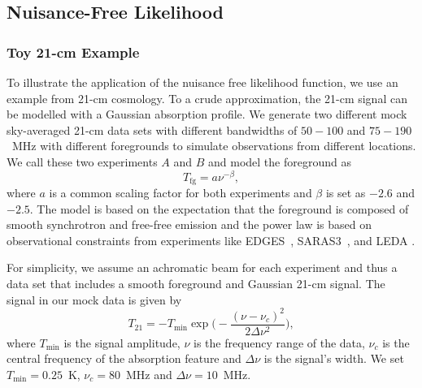 \subsection{Nuisance-Free Likelihood}
\label{sec:nuisance_free_likelihood_apps}

\subsubsection{Toy 21-cm Example}

To illustrate the application of the nuisance free likelihood function, we use an example from 21-cm cosmology.
To a crude approximation, the 21-cm signal can be modelled with a Gaussian absorption profile. %
We generate two different mock sky-averaged 21-cm data sets with different bandwidths of $50- 100$ and $75 - 190$~MHz with different foregrounds to simulate observations from different locations. We call these two experiments $A$ and $B$ and model the foreground as
\begin{equation}
    T_\mathrm{fg} = a \nu^{-\beta},
\end{equation}
where $a$ is a common scaling factor for both experiments and $\beta$ is set as $-2.6$ and $-2.5$. The model is based on the expectation that the foreground is composed of smooth synchrotron and free-free emission and the power law is based on observational constraints from experiments like EDGES~\citep{Mozdzen_EDGES_spectral_index_2017}, SARAS3~\citep{SARAS3}, and LEDA \citep{LEDA_spectral_Index_2021}.

For simplicity, we assume an achromatic beam for each experiment and thus a data set that includes a smooth foreground and Gaussian 21-cm signal. The signal in our mock data is given by
\begin{equation}
    T_{21} = - T_\mathrm{min} \exp\bigg(-\frac{(\nu - \nu_c)^2}{2\Delta \nu ^2}\bigg),
    \label{eq:gaussian_signal}
\end{equation}
where $T_\mathrm{min}$ is the signal amplitude, $\nu$ is the frequency range of the data, $\nu_c$ is the central frequency of the absorption feature and $\Delta \nu$ is the signal's width. We set $T_\mathrm{min} = 0.25$~K, $\nu_c = 80$~MHz and $\Delta \nu = 10$~MHz.

